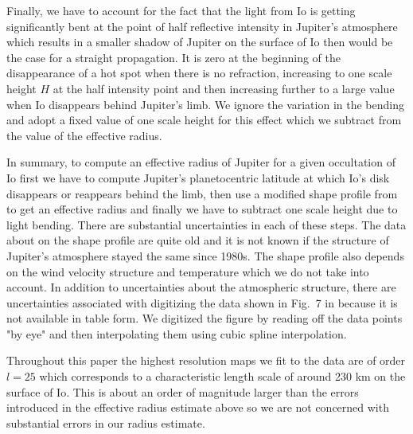 \documentclass[modern]{aastex62}
\begin{document}
Finally, we have to account for the fact that the light from Io is getting significantly bent at the point of half reflective intensity in Jupiter's atmosphere which results in a smaller shadow of Jupiter on the surface of Io then would be the case for a straight propagation.
It is zero at the beginning of the disappearance of a hot spot when there is no refraction, increasing to one scale height $H$ at the half intensity point and then increasing further to a large value when Io disappears behind Jupiter's limb.
We ignore the variation in the bending and adopt a fixed value of one scale height for this effect which we subtract from the value of the effective radius.

In summary, to compute an effective radius of Jupiter for a given occultation of Io first we have to compute Jupiter's planetocentric latitude at which Io's disk disappears or reappears behind the limb, then use a modified shape profile from \cite{lindal1981} to get an effective radius and finally we have to subtract one scale height due to light bending.
There are substantial uncertainties in each of these steps.
The data about on the shape profile are quite old and it is not known if the structure of Jupiter's atmosphere stayed the same since 1980s. 
The shape profile also depends on the wind velocity structure and temperature which we do not take into account.
In addition to uncertainties about the atmospheric structure, there are uncertainties associated with digitizing the data shown in Fig.~7 in \cite{lindal1981} because it is not available in table form.
We digitized the figure by reading off the data points "by eye" and then interpolating them using cubic spline interpolation.

Throughout this paper the highest resolution maps we fit to the data are of order $l=25$ which corresponds to a characteristic length scale of around 230 km on the surface of Io.
This is about an order of magnitude larger than the errors introduced in the effective radius estimate above so we are not concerned with substantial errors in our radius estimate.
\end{document}
